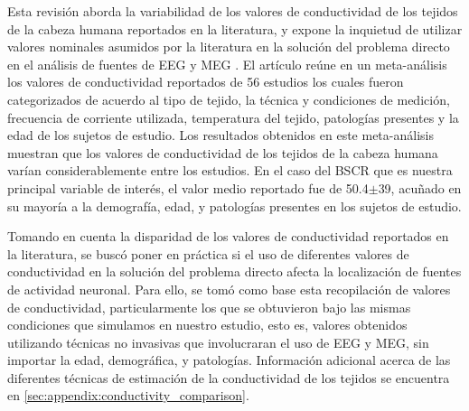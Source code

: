 Esta revisión aborda la variabilidad de los valores de conductividad de los tejidos de la cabeza humana reportados en la literatura, y expone la inquietud de utilizar valores nominales asumidos por la literatura en la solución del problema directo en el análisis de fuentes de EEG y MEG \cite{McCann2019}.
El artículo reúne en un meta-análisis los valores de conductividad reportados de 56 estudios los cuales fueron categorizados de acuerdo al tipo de tejido, la técnica y condiciones de medición, frecuencia de corriente utilizada, temperatura del tejido, patologías presentes y la edad de los sujetos de estudio.
Los resultados obtenidos en este meta-análisis muestran que los valores de conductividad de los tejidos de la cabeza humana varían considerablemente entre los estudios. 
En el caso del BSCR que es nuestra principal variable de interés, el valor medio reportado fue de 50.4$\mathbf{\pm}$39, acuñado en su mayoría a la demografía, edad, y patologías presentes en los sujetos de estudio.

Tomando en cuenta la disparidad de los valores de conductividad reportados en la literatura, se buscó poner en práctica si el uso de diferentes valores de conductividad en la solución del problema directo afecta la localización de fuentes de actividad neuronal.
Para ello, se tomó como base esta recopilación de valores de conductividad, particularmente los que se obtuvieron bajo las mismas condiciones que simulamos en nuestro estudio, esto es, valores obtenidos utilizando técnicas no invasivas que involucraran el uso de EEG y MEG, sin importar la edad, demográfica, y patologías.
Información adicional acerca de las diferentes técnicas de estimación de la conductividad de los tejidos se encuentra en \cref{sec:appendix:conductivity_comparison}.

